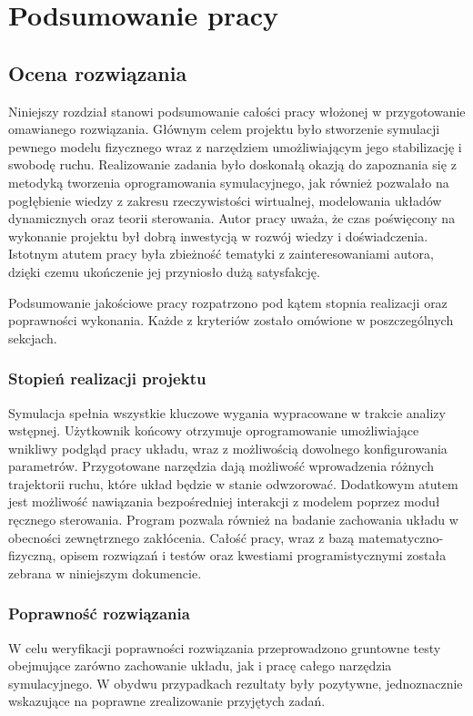 \documentclass[12pt, oneside]{report}
\theoremstyle{definition}
\begin{document}
\newpage
\chapter{Podsumowanie pracy}
\section{Ocena rozwiązania}
Niniejszy rozdział stanowi podsumowanie całości pracy włożonej w przygotowanie omawianego rozwiązania. Głównym celem projektu było stworzenie symulacji pewnego modelu fizycznego wraz z narzędziem umożliwiającym jego stabilizację i swobodę ruchu. Realizowanie zadania było doskonałą okazją do zapoznania się z metodyką tworzenia oprogramowania symulacyjnego, jak również pozwalało na pogłębienie wiedzy z zakresu rzeczywistości wirtualnej, modelowania układów dynamicznych oraz teorii sterowania. Autor pracy uważa, że czas poświęcony na wykonanie projektu był dobrą inwestycją w rozwój wiedzy i doświadczenia. Istotnym atutem pracy była zbieżność tematyki z zainteresowaniami autora, dzięki czemu ukończenie jej przyniosło dużą satysfakcję. 

Podsumowanie jakościowe pracy rozpatrzono pod kątem stopnia realizacji oraz poprawności wykonania. Każde z kryteriów zostało omówione w poszczególnych sekcjach.

\subsection{Stopień realizacji projektu}
Symulacja spełnia wszystkie kluczowe wygania wypracowane w trakcie analizy wstępnej. Użytkownik końcowy otrzymuje oprogramowanie umożliwiające wnikliwy podgląd pracy układu, wraz z możliwością dowolnego konfigurowania parametrów. Przygotowane narzędzia dają możliwość wprowadzenia różnych trajektorii ruchu, które układ będzie w stanie odwzorować. Dodatkowym atutem jest możliwość nawiązania bezpośredniej interakcji z modelem poprzez moduł ręcznego sterowania. Program pozwala również na badanie zachowania układu w obecności zewnętrznego zakłócenia. Całość pracy, wraz z bazą matematyczno-fizyczną, opisem rozwiązań i testów oraz kwestiami programistycznymi została zebrana w niniejszym dokumencie.

\subsection{Poprawność rozwiązania}
W celu weryfikacji poprawności rozwiązania przeprowadzono gruntowne testy obejmujące zarówno zachowanie układu, jak i pracę całego narzędzia symulacyjnego. W obydwu przypadkach rezultaty były pozytywne, jednoznacznie wskazujące na poprawne zrealizowanie przyjętych zadań.
\end{document}
